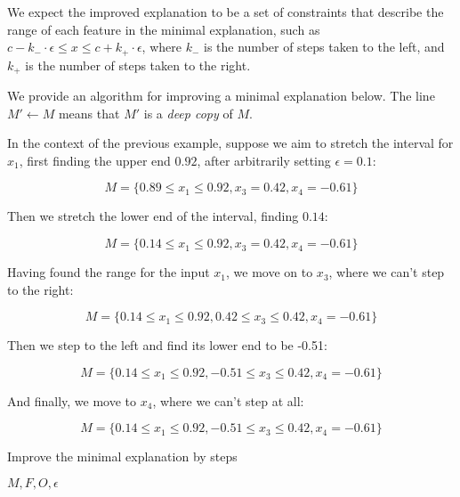 \documentclass[12pt]{article}
\begin{document}
We expect the improved explanation to be a set of constraints that describe the range of each feature in the minimal explanation, such as $c - k_{-} \cdot \epsilon \le x \le c + k_{+} \cdot \epsilon$, where $k_{-}$ is the number of steps taken to the left, and $k_{+}$ is the number of steps taken to the right.

We provide an algorithm for improving a minimal explanation below. The line $M' \gets M$ means that $M'$ is a \emph{deep copy} of $M$.

In the context of the previous example, suppose we aim to stretch the interval for $x_1$, first finding the upper end $0.92$, after arbitrarily setting $\epsilon = 0.1$:

\[
	M = \{0.89 \le x_1 \le 0.92,
	      x_3 =  0.42,
	      x_4 = -0.61\}
\]

Then we stretch the lower end of the interval, finding $0.14$:

\[
	M = \{0.14 \le x_1 \le 0.92,
	      x_3 =  0.42,
	      x_4 = -0.61\}
\]

Having found the range for the input $x_1$, we move on to $x_3$, where we can't step to the right:

\[
	M = \{0.14 \le x_1 \le 0.92,
	      0.42 \le x_3 \le 0.42,
	      x_4 = -0.61\}
\]

Then we step to the left and find its lower end to be -0.51:

\[
	M = \{ 0.14 \le x_1 \le 0.92,
	      -0.51 \le x_3 \le 0.42,
	      x_4 = -0.61\}
\]

And finally, we move to $x_4$, where we can't step at all:

\[
	M = \{ 0.14 \le x_1 \le 0.92,
	      -0.51 \le x_3 \le 0.42,
	      x_4 = -0.61\}
\]




\begin{algorithm}
	\caption{Improve the minimal explanation by steps}
	\begin{algorithmic}
		 {$M, F, O, \epsilon$}
				\EndWhile
				\\
				\EndWhile
			\EndFor
			\\
		\EndProcedure
	\end{algorithmic}
\end{algorithm}
\end{document}
